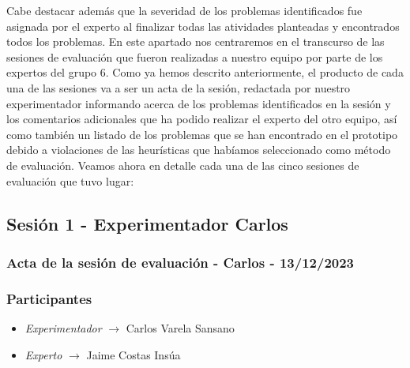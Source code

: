 Cabe destacar además que la severidad de los problemas identificados fue asignada por el experto al finalizar todas las atividades planteadas y encontrados todos los problemas. En este apartado nos centraremos en el transcurso de las sesiones de evaluación que fueron realizadas a nuestro equipo por parte de los expertos del grupo 6. Como ya hemos descrito anteriormente, el producto de
cada una de las sesiones va a ser un acta de la sesión, redactada por nuestro experimentador informando acerca de los problemas identificados en la sesión y los comentarios adicionales que ha podido realizar el
experto del otro equipo, así como también un listado de los problemas que se han encontrado en el prototipo debido a violaciones de las heurísticas que habíamos seleccionado como método de evaluación. Veamos ahora
en detalle cada una de las cinco sesiones de evaluación que tuvo lugar:
\subsection{Sesión 1 - Experimentador Carlos}
\subsubsection{Acta de la sesión de evaluación - Carlos - 13/12/2023}
\subsubsection{Participantes}
\begin{itemize}
    \item \textit{Experimentador} $\rightarrow$ Carlos Varela Sansano
    \item \textit{Experto} $\rightarrow$ Jaime Costas Insúa
\end{itemize}

